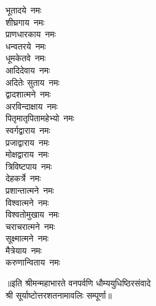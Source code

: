 \begin{multicols}{2}
\begin{flushleft}
भूतादये~नमः\\
शीघ्रगाय~नमः\hfill{}\\
प्राणधारकाय~नमः\\
धन्वतरये~नमः\\
धूमकेतवे~नमः\\
आदिदेवाय~नमः\\
अदितेः सुताय~नमः\\
द्वादशात्मने~नमः\\
अरविन्दाक्षाय~नमः\\
पितृमातृपितामहेभ्यो~नमः\\
स्वर्गद्वाराय~नमः\\
प्रजाद्वाराय~नमः\hfill{}\\
मोक्षद्वाराय~नमः\\
त्रिविष्टपाय~नमः\\
देहकर्त्रे~नमः\\
प्रशान्तात्मने~नमः\\
विश्वात्मने~नमः\\
विश्वतोमुखाय~नमः\\
चराचरात्मने~नमः\\
सूक्ष्मात्मने~नमः\\
मैत्रेयाय~नमः\\
करुणान्विताय~नमः\hfill{}\\
    \end{flushleft}
\end{multicols}
॥इति श्रीमन्महाभारते वनपर्वणि धौम्ययुधिष्ठिरसंवादे\\श्री सूर्याष्टोत्तरशतनामावलिः सम्पूर्णा॥
